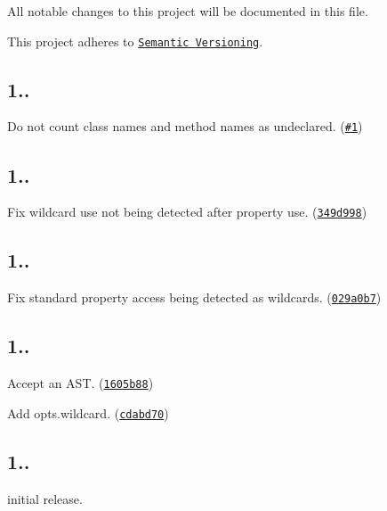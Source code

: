 All notable changes to this project will be documented in this file.

This project adheres to \href{http://semver.org/}{\tt Semantic Versioning}.

\subsection*{1..}


\begin{DoxyItemize}
\item Do not count class names and method names as undeclared. (\href{https://github.com/goto-bus-stop/undeclared-identifiers/pull/1}{\tt \#1})
\end{DoxyItemize}

\subsection*{1..}


\begin{DoxyItemize}
\item Fix wildcard use not being detected after property use. (\href{https://github.com/goto-bus-stop/undeclared-identifiers/commit/349d998559f83976ccd3b3d091e2b06f00ce4189}{\tt 349d998})
\end{DoxyItemize}

\subsection*{1..}


\begin{DoxyItemize}
\item Fix standard property access being detected as wildcards. (\href{https://github.com/goto-bus-stop/undeclared-identifiers/commit/029a0b773a7a4d2402a6de19c8c8693407f8da63}{\tt 029a0b7})
\end{DoxyItemize}

\subsection*{1..}


\begin{DoxyItemize}
\item Accept an A\+ST. (\href{https://github.com/goto-bus-stop/undeclared-identifiers/commit/1605b881cd567894fab1ee2727961dd715a38820}{\tt 1605b88})
\item Add {\ttfamily opts.\+wildcard}. (\href{https://github.com/goto-bus-stop/undeclared-identifiers/commit/cdabd70e000b2fa976c7f4118757736e023b93f2}{\tt cdabd70})
\end{DoxyItemize}

\subsection*{1..}


\begin{DoxyItemize}
\item initial release. 
\end{DoxyItemize}